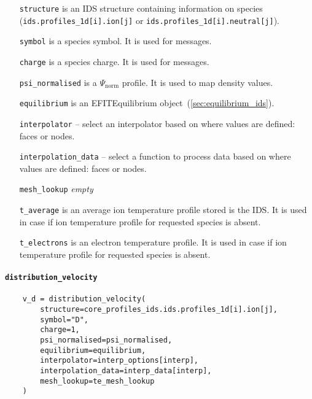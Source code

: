 \documentclass[../main.tex]{subfiles}
\begin{document}
\begin{itemize}[align=left]
    \item[\texttt{structure}] is an IDS structure containing information on species (\texttt{ids.profiles\_1d[i].ion[j]} or \texttt{ids.profiles\_1d[i].neutral[j]}).
    \item[\texttt{symbol}] is a species symbol. It is used for messages.
    \item[\texttt{charge}] is a species charge. It is used for messages.
    \item[\texttt{psi\_normalised}] is a $\Psi_\text{norm}$ profile. It is used to map density values.
    \item[\texttt{equilibrium}] is an EFITEquilibrium object~(\cref{sec:equilibrium_ids}).
    \item[\texttt{interpolator}] -- select an interpolator based on where values are defined: faces or nodes.
    \item[\texttt{interpolation\_data}] -- select a function to process data based on where values are defined: faces or nodes.
    \item[\texttt{mesh\_lookup}] \emph{empty}
    \item[\texttt{t\_average}] is an average ion temperature profile stored is the IDS. It is used in case if ion temperature profile for requested species is absent.
    \item[\texttt{t\_electrons}] is an electron temperature profile. It is used in case if ion temperature profile for requested species is absent.
\end{itemize}

\paragraph{\texttt{distribution\_velocity}}%
\label{par:distribution_velocity}

\begin{verbatim}
    v_d = distribution_velocity(
        structure=core_profiles_ids.ids.profiles_1d[i].ion[j],
        symbol="D",
        charge=1,
        psi_normalised=psi_normalised,
        equilibrium=equilibrium,
        interpolator=interp_options[interp],
        interpolation_data=interp_data[interp],
        mesh_lookup=te_mesh_lookup
    )
\end{verbatim}
\end{document}
